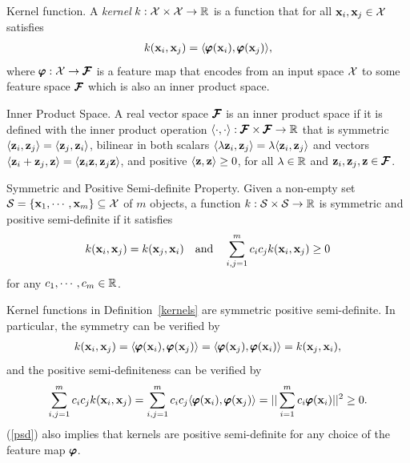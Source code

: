 {%
\begin{definition}{Kernel function.}\label{kernels}
	A \textit{kernel} $k:\mathcal{X}\times\mathcal{X}\rightarrow\mathbb{R}$ is a function that for all $\mathbf {x}_i,\mathbf {x}_j\in\mathcal{X}$ satisfies
	\begin{align*}
		k(\mathbf {x}_i,\mathbf {x}_j) = \langle \pmb \varphi(\mathbf {x}_i), \pmb \varphi(\mathbf {x}_j) \rangle,
	\end{align*}
	where $\pmb \varphi:\mathcal{X}\rightarrow\pmb {\mathcal{F}}$ is a feature map that encodes from an input space $\mathcal{X}$ to some feature space $\pmb {\mathcal{F}}$ which is also an inner product space.
\end{definition}
\begin{definition}{Inner Product Space.}
	A real vector space $\pmb {\mathcal{F}}$ is an inner product space if it is defined with the inner product operation $\langle \cdot, \cdot \rangle:\pmb {\mathcal{F}}\times\pmb {\mathcal{F}}\rightarrow\mathbb{R}$ that is symmetric $\langle \mathbf {z}_i, \mathbf {z}_j \rangle = \langle \mathbf {z}_j, \mathbf {z}_i \rangle$, bilinear in both scalars $\langle \lambda\mathbf {z}_i, \mathbf {z}_j \rangle = \lambda\langle \mathbf {z}_i, \mathbf {z}_j \rangle$ and vectors $\langle \mathbf {z}_i+\mathbf {z}_j, \mathbf {z} \rangle = \langle \mathbf {z}_i\mathbf {z}, \mathbf {z}_j\mathbf {z} \rangle$, and positive $\langle \mathbf {z}, \mathbf {z} \rangle\ge0$, for all $\lambda\in\mathbb{R}$ and $\mathbf {z}_i,\mathbf {z}_j,\mathbf {z}\in\pmb {\mathcal{F}}$.
\end{definition}
\begin{definition}{Symmetric and Positive Semi-definite Property.}\label{psdkernel}
	Given a non-empty set $\mathcal{S}=\{\mathbf {x}_1,\cdots,\mathbf {x}_m\}\subseteq\mathcal{X}$ of $m$ objects, a function $k:\mathcal{S}\times\mathcal{S}\rightarrow\mathbb{R}$ is symmetric and positive semi-definite if it satisfies
	\begin{align*}
		k(\mathbf {x}_i,\mathbf {x}_j) = k(\mathbf {x}_j,\mathbf {x}_i)\quad \text{and}\quad \sum_{i,j=1}^mc_ic_jk(\mathbf {x}_i,\mathbf {x}_j)\ge0
	\end{align*}
	for any $c_1,\cdots,c_m\in\mathbb{R}$.
\end{definition}
\noindent
Kernel functions in Definition~\ref{kernels} are symmetric positive semi-definite.
In particular, the symmetry can be verified by
\begin{align*}
	k(\mathbf {x}_i,\mathbf {x}_j) = \langle \pmb \varphi(\mathbf {x}_i), \pmb \varphi(\mathbf {x}_j) \rangle = \langle \pmb \varphi(\mathbf {x}_j), \pmb \varphi(\mathbf {x}_i) \rangle = k(\mathbf {x}_j,\mathbf {x}_i),
\end{align*}
and the positive semi-definiteness can be verified by
\begin{align}
	\sum_{i,j=1}^{m}c_ic_jk(\mathbf {x}_i,\mathbf {x}_j) = \sum_{i,j=1}^{m}c_ic_j\langle \pmb \varphi(\mathbf {x}_i), \pmb \varphi(\mathbf {x}_j) \rangle = ||\sum_{i=1}^{m}c_i\pmb \varphi(\mathbf {x}_i)||^2\ge0. \label{psd}
\end{align}
(\ref{psd}) also implies that kernels are positive semi-definite for any choice of the feature map $\pmb \varphi$.
}
